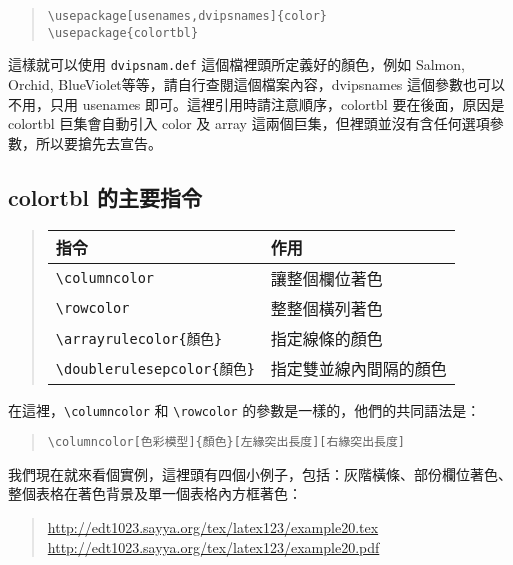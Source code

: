 \begin{quote}
  \begin{verbatim}
\usepackage[usenames,dvipsnames]{color}
\usepackage{colortbl}
\end{verbatim}
\end{quote}

這樣就可以使用 \texttt{dvipsnam.def} 這個檔裡頭所定義好的顏色，例如 Salmon, Orchid, BlueViolet\chdots{}等等，請自行查閱這個檔案內容，{\ttfamily dvipsnames} 這個參數也可以不用，只用 {\ttfamily usenames} 即可。這裡引用時請注意順序，\textsf{colortbl} 要在後面，原因是 \textsf{colortbl} 巨集會自動引入 \textsf{color} 及 \textsf{array} 這兩個巨集，但裡頭並沒有含任何選項參數，所以要搶先去宣告。

\subsection{colortbl 的主要指令}
\label{subsec:colortbl}

\begin{quote}
  \begin{tabular}{ll}
    指令                    & 作用                   \\
    \hline
    \verb=\columncolor= & 讓整個欄位著色         \\
    \verb=\rowcolor= & 整整個橫列著色         \\
    \verb=\arrayrulecolor{顏色}= & 指定線條的顏色         \\
    \verb=\doublerulesepcolor{顏色}= & 指定雙並線內間隔的顏色
  \end{tabular}
\end{quote}
%
%

在這裡，\verb|\columncolor| 和 \verb|\rowcolor| 的參數是一樣的，他們的共同語法是：

\begin{quote}
  \begin{verbatim}
\columncolor[色彩模型]{顏色}[左緣突出長度][右緣突出長度]
\end{verbatim}
\end{quote}

我們現在就來看個實例，這裡頭有四個小例子，包括：灰階橫條、部份欄位著色、整個表格在著色背景及單一個表格內方框著色：

\begin{quote}
  \url{http://edt1023.sayya.org/tex/latex123/example20.tex}\\
  \url{http://edt1023.sayya.org/tex/latex123/example20.pdf}
\end{quote}


